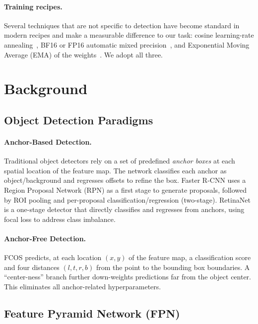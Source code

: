 \documentclass[11pt,a4paper]{article}
\begin{document}
\paragraph{Training recipes.}
Several techniques that are not specific to detection have become standard in modern recipes and make a measurable difference to our task: cosine learning-rate annealing~\cite{loshchilov2017sgdr}, BF16 or FP16 automatic mixed precision~\cite{micikevicius2018mixed}, and Exponential Moving Average (EMA) of the weights~\cite{polyak1992averaging, tarvainen2017mean}. We adopt all three.

\section{Background}
\label{sec:background}

\subsection{Object Detection Paradigms}

\paragraph{Anchor-Based Detection.}
Traditional object detectors rely on a set of predefined \emph{anchor boxes} at each spatial location of the feature map. The network classifies each anchor as object/background and regresses offsets to refine the box. Faster R-CNN uses a Region Proposal Network (RPN) as a first stage to generate proposals, followed by ROI pooling and per-proposal classification/regression (two-stage). RetinaNet is a one-stage detector that directly classifies and regresses from anchors, using focal loss to address class imbalance.

\paragraph{Anchor-Free Detection.}
FCOS predicts, at each location $(x,y)$ of the feature map, a classification score and four distances $(l, t, r, b)$ from the point to the bounding box boundaries. A ``center-ness'' branch further down-weights predictions far from the object center. This eliminates all anchor-related hyperparameters.

\subsection{Feature Pyramid Network (FPN)}
\end{document}
